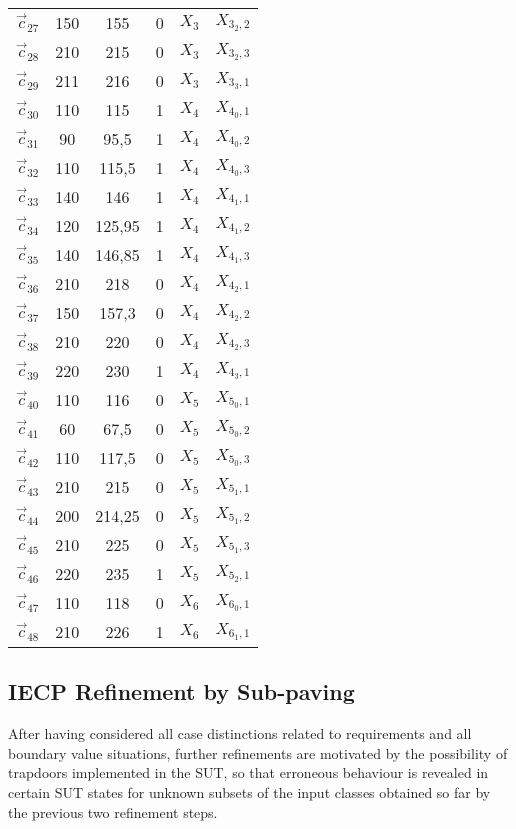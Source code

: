 \begin{table}[htdp]
\begin{center}
\begin{tabular}{|c||c|c|c||c|c|}
$\vec c_{27}$&150&155&0&$X_3$ &$X_{3_2,2}$ \\
$\vec c_{28}$&210&215&0&$X_3$ &$X_{3_2,3}$ \\
$\vec c_{29}$&211&216&0&$X_3$ &$X_{3_3,1}$ \\
$\vec c_{30}$&110&115&1&$X_4$&$X_{4_0,1}$ \\
$\vec c_{31}$&90&95,5&1&$X_4$&$X_{4_0,2}$ \\
$\vec c_{32}$&110&115,5&1&$X_4$&$X_{4_0,3}$ \\
$\vec c_{33}$&140&146&1&$X_4$&$X_{4_1,1}$ \\
$\vec c_{34}$&120&125,95&1&$X_4$&$X_{4_1,2}$ \\
$\vec c_{35}$&140&146,85&1&$X_4$&$X_{4_1,3}$ \\
$\vec c_{36}$&210&218&0&$X_4$&$X_{4_2,1}$ \\
$\vec c_{37}$&150&157,3&0&$X_4$&$X_{4_2,2}$ \\
$\vec c_{38}$&210&220&0&$X_4$&$X_{4_2,3}$ \\
$\vec c_{39}$&220&230&1&$X_4$&$X_{4_3,1}$ \\
$\vec c_{40}$&110&116&0&$X_5$&$X_{5_0,1}$ \\
$\vec c_{41}$&60&67,5&0&$X_5$&$X_{5_0,2}$ \\
$\vec c_{42}$&110&117,5&0&$X_5$&$X_{5_0,3}$ \\
$\vec c_{43}$&210&215&0&$X_5$&$X_{5_1,1}$ \\
$\vec c_{44}$&200&214,25&0&$X_5$&$X_{5_1,2}$ \\
$\vec c_{45}$&210&225&0&$X_5$&$X_{5_1,3}$ \\
$\vec c_{46}$&220&235&1&$X_5$&$X_{5_2,1}$ \\
$\vec c_{47}$&110&118&0&$X_6$&$X_{6_0,1}$ \\
$\vec c_{48}$&210&226&1&$X_6$&$X_{6_1,1}$ 
\\\hline\hline
\end{tabular}
\normalsize
\end{center}
\label{tab:inputalphabetreqrefboundary}
\end{table}


\subsection{IECP Refinement by Sub-paving}

After having considered all case distinctions related to requirements and all boundary value situations, further refinements are motivated by the possibility of trapdoors implemented in the SUT, so that erroneous behaviour is revealed in certain SUT states for unknown subsets of the input classes obtained so far by the previous two refinement steps.

